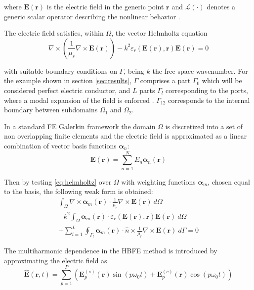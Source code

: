\documentclass[journal]{IEEEtran}
\renewcommand{\vec}[1]{\mathbf{#1}}
\begin{document}
\noindent where $\vec{E}(\vec{r})$ is the electric field in the generic point
$\vec{r}$ and $\mathcal{L}(\cdot)$ denotes a generic scalar operator describing the
nonlinear behavior \cite{Guarnieri2010}. 

The electric field satisfies, within $\Omega$, the vector Helmholtz equation
%
\begin{equation}
\label{eq:helmholtz}
\nabla \times \left ( \frac{1}{\mu_r} \nabla \times \vec{E}(\vec{r}) \right )  - {k}^2 
\varepsilon_r \left(\vec{E}(\vec{r}), \vec{r} \right) \vec{E}(\vec{r}) = 0
\end{equation} 

\noindent with suitable boundary conditions on $\Gamma$, being $k$ the free
space wavenumber. For the example shown in section \ref{sec:results}, $\Gamma$
comprises a part $\Gamma_0$ which will be considered perfect electric conductor, and $L$ parts $\Gamma_l$
corresponding to the ports, where a modal expansion of the field is enforced \cite{Pelosi2009}. 
$\Gamma_{12}$ corresponds to the internal boundary between subdomains $\Omega_1$ and $\Omega_2$.

In a standard FE Galerkin framework the domain $\Omega$ is
discretized into a set of non overlapping finite elements and the electric
field is approximated as a linear combination of vector basis functions $\boldsymbol{\alpha}_n$:
%
\begin{equation}\label{e:femexpansion}
\vec{E}(\vec{r})  = \sum_{n=1}^N E_n \boldsymbol{\alpha}_n(\vec{r})
\end{equation} 

Then by testing \eqref{eq:helmholtz} over $\Omega$ with weighting functions
 $\boldsymbol{\alpha}_m$, chosen equal to the basis, the following weak form is
 obtained:
%
\begin{multline}\label{eq:fem}
\int_\Omega \nabla \times \boldsymbol{\alpha}_m (\vec{r}) \cdot \frac{1}{\mu_r}
\nabla \times \vec{E}(\vec{r}) \ d\Omega \\
- k^2 \int_\Omega  \boldsymbol{\alpha}_m (\vec{r}) \cdot \varepsilon_r 
(\vec{E}(\vec{r}), \vec{r}) \vec{E}(\vec{r}) \ d\Omega \\
+ \sum_{l=1}^{L}\oint_{\Gamma_l} \boldsymbol{\alpha}_m (\vec{r}) \cdot \hat{n} \times \frac{1}{\mu_r} 
\nabla \times \vec{E}(\vec{r}) \ d\Gamma = 0
\end{multline} 


The multiharmonic dependence in the HBFE method is introduced by approximating
the electric field as \cite{Bachinger2005}
%
\begin{equation} \label{eq:field}
\vec{\hat{E}}(\vec{r}, t) = \sum^P_{p=1} \left( \vec{E}_{p}^{(s)}(\vec{r}) \sin(p
\omega_0 t) + \vec{E}_p^{(c)}(\vec{r}) \cos(p \omega_0 t) \right)
\end{equation} 
\end{document}

